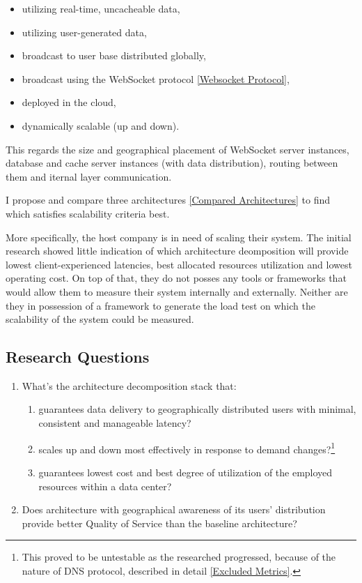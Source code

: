 \documentclass{uvamscse}
\begin{document}
\begin{itemize}
  \item utilizing real-time, uncacheable data,
  \item utilizing user-generated data,
  \item broadcast to user base distributed globally,
  \item broadcast using the WebSocket protocol \ref{Websocket Protocol},
  \item deployed in the cloud,
  \item dynamically scalable (up and down).
\end{itemize}

This regards the size and geographical placement of WebSocket server instances, database and cache server instances (with data distribution), routing between them and iternal layer communication.

I propose and compare three architectures \ref{Compared Architectures} to find which satisfies scalability criteria best.

More specifically, the host company is in need of scaling their system. The initial research showed little indication of which architecture deomposition will provide lowest client-experienced latencies, best allocated resources utilization and lowest operating cost. On top of that, they do not posses any tools or frameworks that would allow them to measure their system internally and externally. Neither are they in possession of a framework to generate the load test on which the scalability of the system could be measured.

\subsection{Research Questions}\label{Research Questions}
\begin{enumerate}
  \item What's the architecture decomposition stack that:
    \begin{enumerate}
      \item guarantees data delivery to geographically distributed users with minimal, consistent and manageable latency?
      \item scales up and down most effectively in response to demand changes?\footnote{This proved to be untestable as the researched progressed, because of the nature of DNS protocol, described in detail \ref{Excluded Metrics}.}
      \item guarantees lowest cost and best degree of utilization of the employed resources within a data center?
    \end{enumerate}
  \item Does architecture with geographical awareness of its users' distribution provide better Quality of Service than the baseline architecture?
\end{enumerate}
\end{document}
